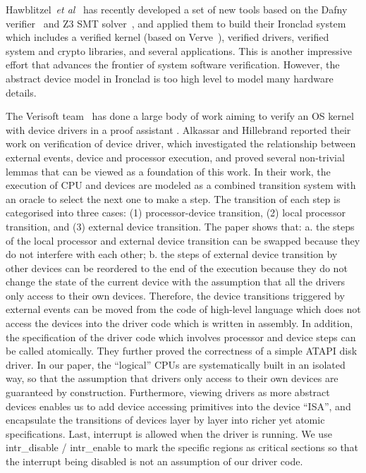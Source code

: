 Hawblitzel~{\em et al}~\cite{ironclad14} has recently developed a set
of new tools based on the Dafny verifier~\cite{dafny10} and Z3 SMT
solver~\cite{moura08}, and applied them to build their Ironclad system
which includes a verified kernel (based on Verve~\cite{hawblitzel10}),
verified drivers, verified system and crypto libraries, and several
applications.  This is another impressive effort that advances the
frontier of system software verification. However, the abstract device
model in Ironclad is too high level to model many hardware details.

The Verisoft team~\cite{verisoft07} has done a large body of work
aiming to verify an OS kernel with device drivers in a proof assistant
\cite{Alkassar:OSVE09,Alkassar:VSTTE08-225,Alkassar:VSTTE2010-71}.
Alkassar and Hillebrand \cite{Alkassar:VSTTE08-225} reported
their work on verification of device
driver, which investigated the relationship between external events, device
and processor execution, and proved several non-trivial lemmas that can be
viewed as a foundation of this work. In their work, the execution of CPU and
devices are modeled as a combined transition system with an oracle to select
the next one to make a step. The transition of each step is categorised into
three cases: (1) processor-device transition, (2) local processor transition,
and (3) external device transition. The paper shows that: a. the steps of the
local processor and external device transition can be swapped because they do
not interfere with each other; b. the steps of external device transition by
other devices can be reordered to the end of the execution because they do not
change the state of the current device with the assumption that all the
drivers only access to their own devices. Therefore, the device transitions
triggered by external events can be moved from the code of high-level language
which does not access the devices into the driver code which is written in
assembly. In addition, the specification of the driver code which involves
processor and device steps can be called atomically. They further proved the
correctness of a simple ATAPI disk driver.
In our paper, the ``logical'' CPUs are systematically built in an isolated way,
so that the assumption that drivers only access to their own devices are
guaranteed by construction. Furthermore, viewing drivers as more abstract devices
enables us to add device accessing primitives into the device “ISA”, and
encapsulate the transitions of devices layer by layer into richer yet atomic
specifications. Last, interrupt is allowed when the driver is running. We use
\textsf{intr\_disable} / \textsf{intr\_enable} to mark the specific regions
as critical sections
so that the interrupt being disabled is not an assumption of our driver code.

